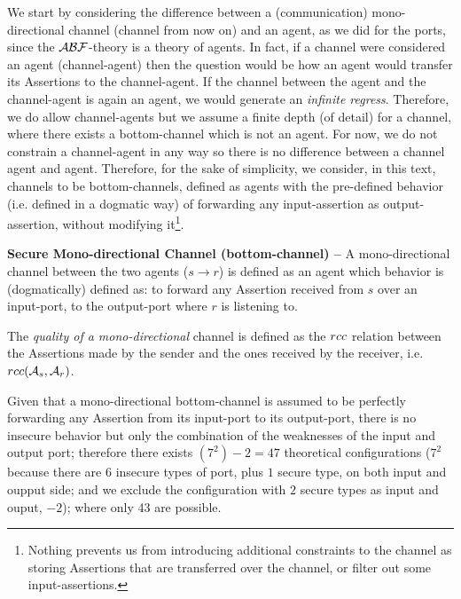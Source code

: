 We start by considering the difference between a (communication)
mono-directional channel (channel from now on) and an agent, as we did for the
ports, since the $\mathcal{A}\mathcal{B}\mathcal{F}$-theory is a theory of agents.  In fact, if a channel
were considered an agent (channel-agent) then the question would be how an
agent would transfer its Assertions to the channel-agent. If the channel
between the agent and the channel-agent is again an agent, we would generate an
\emph{infinite regress}. Therefore, we do allow channel-agents but we assume a
finite depth (of detail) for a channel, where there exists a bottom-channel
which is not an agent. For now, we do not constrain a channel-agent in any way
so there is no difference between a channel agent and agent. Therefore, for the
sake of simplicity, we consider, in this text, channels to be bottom-channels,
defined as agents with the pre-defined behavior (i.e. defined in a dogmatic
way) of forwarding any input-assertion as output-assertion, without modifying it\footnote{Nothing
prevents us from introducing additional constraints to the channel as storing
Assertions that are transferred over the channel, or filter out some
input-assertions.}.

\begin{definition}{\bf Secure Mono-directional Channel (bottom-channel) --}\label{def:monochannel}
	A mono-directional channel between the two agents ($s \rightarrow r$) is defined as 
	an agent which behavior is (dogmatically) defined as: to forward any Assertion received from $s$ over an input-port, to  
	the output-port where $r$ is listening to.
\end{definition}
The \emph{quality of a mono-directional} channel is defined as the 
$rcc$ relation between the Assertions made by the sender and the ones received by the receiver, i.e. $rcc(\mathcal{A}_s,\mathcal{A}_r)$.

Given that a mono-directional bottom-channel is assumed to be perfectly
forwarding any Assertion from its input-port to its output-port, there is no
insecure behavior but only the combination of the weaknesses of the input and
output port; therefore there exists $(7^2)-2=47$ theoretical configurations
($7^2$ because there are $6$ insecure types of port, plus $1$ secure type, on both input and oupput
side; and we exclude the configuration with $2$ secure types as input
and ouput, $-2$); where only 43 are possible.

